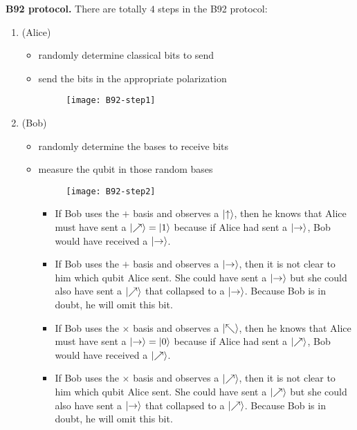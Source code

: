\documentclass{easyclass}
\begin{document}
\textbf{B92 protocol.} There are totally $4$ steps in the B92 protocol:
\begin{enumerate}
	\item (Alice) 
		\begin{itemize}
			\item randomly determine classical bits to send
			\item send the bits in the appropriate polarization
			\begin{figure}[h]
				\centering
				\texttt{[image: B92-step1]}
				\label{fig:B92-step1}
			\end{figure}
		\end{itemize}
	
	\item (Bob)
		\begin{itemize}
			\item randomly determine the bases to receive bits
			\item measure the qubit in those random bases 
			
			\begin{figure}[h]
				\centering
				\texttt{[image: B92-step2]}
				\label{fig:B92-step2}
			\end{figure}
		
			\begin{itemize}
				\item If Bob uses the $+$ basis and observes a $\ket{\uparrow}$, then he knows that Alice must have sent a $\ket{\nearrow}=\ket{1}$ because if Alice had sent a $\ket{\rightarrow}$, Bob would have received a $\ket{\rightarrow}$.
				
				\item If Bob uses the $+$ basis and observes a $\ket{\rightarrow}$, then it is not clear to him which qubit Alice sent. She could have sent a $\ket{\rightarrow}$ but she could also have sent a $\ket{\nearrow}$
				that collapsed to a $\ket{\rightarrow}$. Because Bob is in doubt, he will omit this bit.
				
				\item If Bob uses the $\times$ basis and observes a $\ket{\nwarrow}$, then he knows that Alice must have sent a $\ket{\rightarrow}=\ket{0}$ because if Alice had sent a $\ket{\nearrow}$, Bob would have received a $\ket{\nearrow}$.
				
				\item If Bob uses the $\times$ basis and observes a $\ket{\nearrow}$, then it is not clear to him which qubit Alice sent. She could have sent a $\ket{\nearrow}$ but she could also have sent a $\ket{\rightarrow}$ that collapsed to a $\ket{\nearrow}$. Because Bob is in doubt, he will omit this bit.
			\end{itemize}
		\end{itemize}
	

\end{enumerate}
\end{document}
